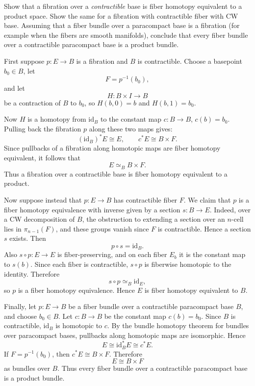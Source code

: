 \documentclass[12pt]{article}
\begin{document}
\begin{problem}[5]
Show that a fibration over a \emph{contractible} base is fiber homotopy equivalent to a product space. Show the same for a fibration with contractible fiber with CW base. Assuming that a fiber bundle over a paracompact base is a fibration (for example when the fibers are smooth manifolds), conclude that every fiber bundle over a contractible paracompact base is a product bundle.
\end{problem}

\begin{solution}
First suppose \(p:E\to B\) is a fibration and \(B\) is contractible. Choose a basepoint \(b_0\in B\), let
\[
F=p^{-1}(b_0),
\]
and let
\[
H:B\times I\to B
\]
be a contraction of \(B\) to \(b_0\), so \(H(b,0)=b\) and \(H(b,1)=b_0\).

Now \(H\) is a homotopy from \(\mathrm{id}_B\) to the constant map \(c:B\to B\), \(c(b)=b_0\). Pulling back the fibration \(p\) along these two maps gives:
\[
(\mathrm{id}_B)^*E \cong E,
\qquad
c^*E \cong B\times F.
\]
Since pullbacks of a fibration along homotopic maps are fiber homotopy equivalent, it follows that
\[
E \simeq_B B\times F.
\]
Thus a fibration over a contractible base is fiber homotopy equivalent to a product.

Now suppose instead that \(p:E\to B\) has contractible fiber \(F\). We claim that \(p\) is a fiber homotopy equivalence with inverse given by a section \(s:B\to E\). Indeed, over a CW decomposition of \(B\), the obstruction to extending a section over an \(n\)-cell lies in \(\pi_{n-1}(F)\), and these groups vanish since \(F\) is contractible. Hence a section \(s\) exists. Then
\[
p\circ s=\mathrm{id}_B.
\]
Also \(s\circ p:E\to E\) is fiber-preserving, and on each fiber \(E_b\) it is the constant map to \(s(b)\). Since each fiber is contractible, \(s\circ p\) is fiberwise homotopic to the identity. Therefore
\[
s\circ p \simeq_B \mathrm{id}_E,
\]
so \(p\) is a fiber homotopy equivalence. Hence \(E\) is fiber homotopy equivalent to \(B\).


Finally, let \(p:E\to B\) be a fiber bundle over a contractible paracompact base \(B\), and choose \(b_0\in B\). Let \(c:B\to B\) be the constant map \(c(b)=b_0\). Since \(B\) is contractible, \(\mathrm{id}_B\) is homotopic to \(c\). By the bundle homotopy theorem for bundles over paracompact bases, pullbacks along homotopic maps are isomorphic. Hence
\[
E \cong \mathrm{id}_B^*E \cong c^*E.
\]
If \(F=p^{-1}(b_0)\), then \(c^*E\cong B\times F\). Therefore
\[
E\cong B\times F
\]
as bundles over \(B\). Thus every fiber bundle over a contractible paracompact base is a product bundle.

\end{solution}
\end{document}
